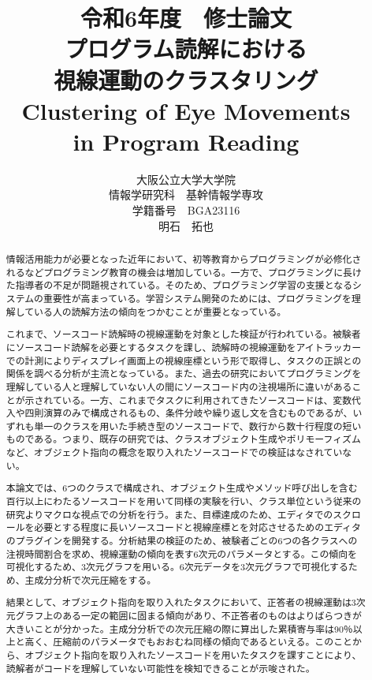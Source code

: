 \documentclass[paper=a4paper,fontsize=11pt]{jlreq}
\title{\huge 令和6年度　修士論文\\\vspace{100truept}プログラム読解における\\視線運動のクラスタリング\\
Clustering of Eye Movements\\ in Program Reading}
\author{\large 大阪公立大学大学院　\\情報学研究科　基幹情報学専攻\\学籍番号　BGA23116\\明石　拓也}
\begin{document}
\maketitle
\clearpage

\begin{abstract}
  情報活用能力が必要となった近年において、初等教育からプログラミングが必修化されるなどプログラミング教育の機会は増加している。一方で、プログラミングに長けた指導者の不足が問題視されている。そのため、プログラミング学習の支援となるシステムの重要性が高まっている。学習システム開発のためには、プログラミングを理解している人の読解方法の傾向をつかむことが重要となっている。
  
  これまで、ソースコード読解時の視線運動を対象とした検証が行われている。被験者にソースコード読解を必要とするタスクを課し、読解時の視線運動をアイトラッカーでの計測によりディスプレイ画面上の視線座標という形で取得し、タスクの正誤との関係を調べる分析が主流となっている。また、過去の研究においてプログラミングを理解している人と理解していない人の間にソースコード内の注視場所に違いがあることが示されている。一方、これまでタスクに利用されてきたソースコードは、変数代入や四則演算のみで構成されるもの、条件分岐や繰り返し文を含むものであるが、いずれも単一のクラスを用いた手続き型のソースコードで、数行から数十行程度の短いものである。つまり、既存の研究では、クラスオブジェクト生成やポリモーフィズムなど、オブジェクト指向の概念を取り入れたソースコードでの検証はなされていない。
  
  本論文では、6つのクラスで構成され、オブジェクト生成やメソッド呼び出しを含む百行以上にわたるソースコードを用いて同様の実験を行い、クラス単位という従来の研究よりマクロな視点での分析を行う。また、目標達成のため、エディタでのスクロールを必要とする程度に長いソースコードと視線座標とを対応させるためのエディタのプラグインを開発する。分析結果の検証のため、被験者ごとの6つの各クラスへの注視時間割合を求め、視線運動の傾向を表す6次元のパラメータとする。この傾向を可視化するため、3次元グラフを用いる。6次元データを3次元グラフで可視化するため、主成分分析で次元圧縮をする。
  
  結果として、オブジェクト指向を取り入れたタスクにおいて、正答者の視線運動は3次元グラフ上のある一定の範囲に固まる傾向があり、不正答者のものはよりばらつきが大きいことが分かった。主成分分析での次元圧縮の際に算出した累積寄与率は90％以上と高く、圧縮前のパラメータでもおおむね同様の傾向であるといえる。このことから、オブジェクト指向を取り入れたソースコードを用いたタスクを課すことにより、読解者がコードを理解していない可能性を検知できることが示唆された。
\end{abstract}
\clearpage
\end{document}
